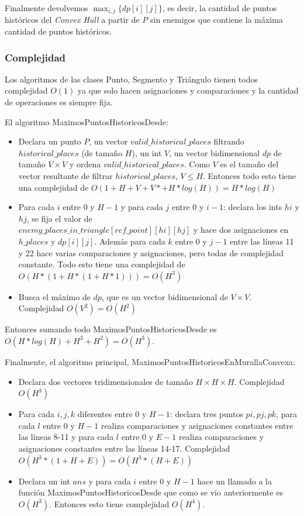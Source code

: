 Finalmente devolvemos $\max_{i,j}\{dp[i][j]\}$, es decir, la cantidad de puntos históricos del \textit{Convex Hull} a partir de $P$
sin enemigos que contiene la máxima cantidad de puntos históricos.

\subsubsection{Complejidad}

Los algoritmos de las clases Punto, Segmento y Triángulo tienen todos complejidad $O(1)$ ya que solo hacen asignaciones y
comparaciones y la cantidad de operaciones es siempre fija.

El algoritmo MaximosPuntosHistoricosDesde:

\begin{itemize}
\item Declara un punto $P$, un vector $valid\_historical\_places$ filtrando $historical\_places$ (de tamaño $H$),
un int $V$, un vector bidimensional $dp$ de tamaño $V \times V$ y ordena $valid\_historical\_places$. Como $V$ es el tamaño
del vector resultante de filtrar $historical\_places$, $V \leq H$.
Entonces todo esto tiene una complejidad de $O(1+H+V+V*+H*log(H)) = H*log(H)$
\item Para cada $i$ entre 0 y $H-1$ y para cada $j$ entre 0 y $i-1$: declara los ints $hi$ y $hj$, se fija el valor de \\
$enemy\_places\_in\_triangle[ref\_point][hi][hj]$ y hace dos asignaciones en $h\_places$ y $dp[i][j]$. Además para cada
$k$ entre 0 y $j-1$ entre las líneas 11 y 22 hace varias comparaciones y asignaciones, pero todas de complejidad constante.
Todo esto tiene una complejidad de $O(H*(1+H*(1+H*1))) = O(H^3)$
\item Busca el máximo de $dp$, que es un vector bidimensional de $V \times V$. Complejidad $O(V^2) = O(H^2)$
\end{itemize}

Entonces sumando todo MaximosPuntosHistoricosDesde es $O(H*log(H)+H^3+H^2) = O(H^3)$.

Finalmente, el algoritmo principal, MaximosPuntosHistoricosEnMurallaConvexa:

\begin{itemize}
\item Declara dos vectores tridimensionales de tamaño $H \times H \times H$. Complejidad $O(H^3)$
\item Para cada $i,j,k$ diferentes entre 0 y $H-1$: declara tres puntos $pi,pj,pk$, para cada $l$ entre 0 y $H-1$
realiza comparaciones y asignaciones constantes entre las líneas 8-11 y para cada $l$ entre 0 y $E-1$
realiza comparaciones y asignaciones constantes entre las líneas 14-17. Complejidad $O(H^3*(1+H+E)) = O(H^3*(H+E))$
\item Declara un int $ans$ y para cada $i$ entre 0 y $H-1$ hace un llamado a la función MaximosPuntosHistoricosDesde que como
se vio anteriormente es $O(H^3)$. Entonces esto tiene complejidad $O(H^4)$.
\end{itemize}


